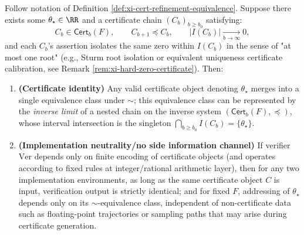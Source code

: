 \begin{theorem}\label{thm:xi-cert-inverse-limit-coherence}
Follow notation of Definition \ref{def:xi-cert-refinement-equivalence}.
Suppose there exists some \(\theta_\star\in\RR\) and a certificate chain \((C_b)_{b\ge b_0}\) satisfying:
\[
C_{b}\in\mathsf{Cert}_b(F),\qquad C_{b+1}\preceq C_{b},\qquad \bigl|I(C_b)\bigr|\xrightarrow[b\to\infty]{}0,
\]
and each \(C_b\)'s assertion isolates the same zero within \(I(C_b)\) in the sense of "at most one root" (e.g., Sturm root isolation or equivalent uniqueness certificate calibration, see Remark \ref{rem:xi-hard-zero-certificate}).
Then:
\begin{enumerate}
  \item \textbf{(Certificate identity)} Any valid certificate object denoting \(\theta_\star\) merges into a single equivalence class under \(\sim\);
  this equivalence class can be represented by the \emph{inverse limit} of a nested chain on the inverse system \((\mathsf{Cert}_b(F),\preceq)\), whose interval intersection is the singleton \(\bigcap_{b\ge b_0} I(C_b)=\{\theta_\star\}\).
  \item \textbf{(Implementation neutrality/no side information channel)}
  If verifier \(\mathrm{Ver}\) depends only on finite encoding of certificate objects (and operates according to fixed rules at integer/rational arithmetic layer),
  then for any two implementation environments, as long as the same certificate object \(C\) is input, verification output is strictly identical;
  and for fixed \(F\), addressing of \(\theta_\star\) depends only on its \(\sim\)-equivalence class, independent of non-certificate data such as floating-point trajectories or sampling paths that may arise during certificate generation.
\end{enumerate}
\end{theorem}

